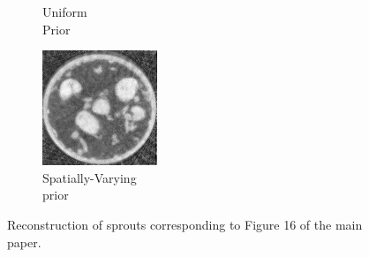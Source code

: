 \documentclass{article}
\begin{document}
\begin{figure}[!h]
\begin{subfigure}[b]{0.38\linewidth}
        \caption{Uniform\\ Prior}
     \end{subfigure}
\quad
    \begin{subfigure}[b]{0.38\linewidth}
        \includegraphics[width=\textwidth]{../images/sprouts/weightedPriorIm.png}
        \caption{Spatially-Varying\\ prior}
    \end{subfigure}
     \caption{Reconstruction of sprouts corresponding to Figure 16 of the main paper.} 
\label{fig:sprouts_3D_results_biggerIm}
\end{figure}
\end{document}
